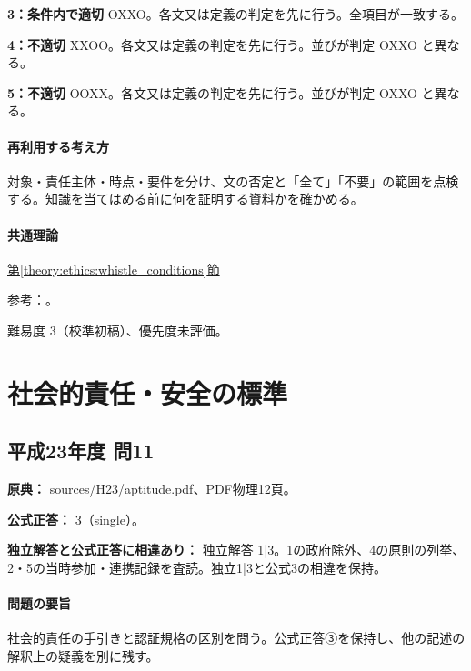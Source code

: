\noindent\textbf{3：条件内で適切} OXXO。各文又は定義の判定を先に行う。全項目が一致する。\par

\noindent\textbf{4：不適切} XXOO。各文又は定義の判定を先に行う。並びが判定 OXXO と異なる。\par

\noindent\textbf{5：不適切} OOXX。各文又は定義の判定を先に行う。並びが判定 OXXO と異なる。\par

\paragraph{再利用する考え方} 対象・責任主体・時点・要件を分け、文の否定と「全て」「不要」の範囲を点検する。知識を当てはめる前に何を証明する資料かを確かめる。

\paragraph{共通理論} \hyperref[theory:ethics:whistle_conditions]{第\ref*{theory:ethics:whistle_conditions}節}

\par 参考：\cite{muroran_ethics_cases}。

\par 難易度 3（校準初稿）、優先度未評価。

\section{社会的責任・安全の標準}

\subsection{平成23年度 問11}
\label{q:h23-reg-apt-11}

\noindent\textbf{原典：} sources/H23/aptitude.pdf、PDF物理12頁。

\textbf{公式正答：} 3（single）。

\par\textbf{独立解答と公式正答に相違あり：} 独立解答 1|3。1の政府除外、4の原則の列挙、2・5の当時参加・連携記録を査読。独立1|3と公式3の相違を保持。

\paragraph{問題の要旨} 社会的責任の手引きと認証規格の区別を問う。公式正答③を保持し、他の記述の解釈上の疑義を別に残す。

